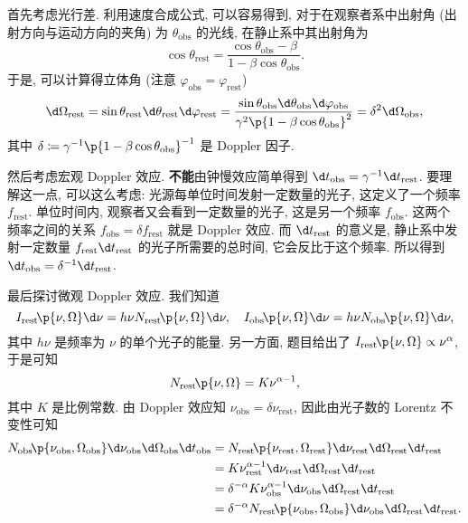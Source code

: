 \documentclass{article}
\newcommand{\mrm}[1]{\mathrm{#1}}
\newcommand{\tbf}[1]{\textbf{#1}}
\newcommand{\alp}{\alpha}
\newcommand{\gma}{\gamma}
\newcommand{\dlt}{\delta}
\newcommand{\vphi}{\varphi}
\newcommand{\tht}{\theta}
\newcommand{\Omg}{\Omega}
\newcommand{\ceq}{\coloneqq}
\newcommand{\fr}{\frac}
\newcommand{\fc}[2]{#1\mathchoice{\!}{\!}{}{}\p{#2}} %
\begin{document}
首先考虑光行差. 利用速度合成公式, 可以容易得到,
对于在观察者系中出射角 (出射方向与运动方向的夹角) 为 $\tht_\mrm{obs}$ 的光线, 在静止系中其出射角为
\[\cos\tht_\mrm{rest}=\fr{\cos\tht_\mrm{obs}-\beta}{1-\beta\cos\tht_\mrm{obs}}.\]
于是, 可以计算得立体角 (注意 $\vphi_\mrm{obs}=\vphi_\mrm{rest}$)
\[\d\Omg_\mrm{rest}=\sin\tht_\mrm{rest}\d\tht_\mrm{rest}\d\vphi_\mrm{rest}
=\fr{\sin\tht_\mrm{obs}\d\tht_\mrm{obs}\d\vphi_\mrm{obs}}{\gma^2\p{1-\beta\cos\tht_\mrm{obs}}^2}
=\dlt^2\d\Omg_\mrm{obs},\]
其中 $\dlt\ceq\gma^{-1}\p{1-\beta\cos\tht_\mrm{obs}}^{-1}$ 是 Doppler 因子.

然后考虑宏观 Doppler 效应. \tbf{不能}由钟慢效应简单得到 $\d t_\mrm{obs}=\gma^{-1}\d t_\mrm{rest}$.
要理解这一点, 可以这么考虑: 光源每单位时间发射一定数量的光子, 这定义了一个频率 $f_\mrm{rest}$.
单位时间内, 观察者又会看到一定数量的光子, 这是另一个频率 $f_\mrm{obs}$.
这两个频率之间的关系 $f_\mrm{obs}=\dlt f_\mrm{rest}$ 就是 Doppler 效应.
而 $\d t_\mrm{rest}$ 的意义是, 静止系中发射一定数量
$f_\mrm{rest}\d t_\mrm{rest}$ 的光子所需要的总时间, 它会反比于这个频率.
所以得到 $\d t_\mrm{obs}=\dlt^{-1}\d t_\mrm{rest}$.

最后探讨微观 Doppler 效应.
我们知道
\[\fc{I_\mrm{rest}}{\nu,\Omg}\d\nu=h\nu\fc{N_\mrm{rest}}{\nu,\Omg}\d\nu,\quad
\fc{I_\mrm{obs}}{\nu,\Omg}\d\nu=h\nu\fc{N_\mrm{obs}}{\nu,\Omg}\d\nu,\]
其中 $h\nu$ 是频率为 $\nu$ 的单个光子的能量.
另一方面, 题目给出了 $\fc{I_\mrm{rest}}{\nu,\Omg}\propto\nu^\alp$, 于是可知
\[\fc{N_\mrm{rest}}{\nu,\Omg}=K\nu^{\alp-1},\]
其中 $K$ 是比例常数.
由 Doppler 效应知 $\nu_\mrm{obs}=\dlt\nu_\mrm{rest}$, 因此由光子数的 Lorentz 不变性可知
\begin{align*}
	\fc{N_\mrm{obs}}{\nu_\mrm{obs},\Omg_\mrm{obs}}\d\nu_\mrm{obs}\d\Omg_\mrm{obs}\d t_\mrm{obs}
	&=\fc{N_\mrm{rest}}{\nu_\mrm{rest},\Omg_\mrm{rest}}\d\nu_\mrm{rest}\d\Omg_\mrm{rest}\d t_\mrm{rest}\\
	&=K\nu_\mrm{rest}^{\alp-1}\d\nu_\mrm{rest}\d\Omg_\mrm{rest}\d t_\mrm{rest}\\
	&=\dlt^{-\alp}K\nu_\mrm{obs}^{\alp-1}\d\nu_\mrm{obs}\d\Omg_\mrm{rest}\d t_\mrm{rest}\\
	&=\dlt^{-\alp}\fc{N_\mrm{rest}}{\nu_\mrm{obs},\Omg_\mrm{obs}}\d\nu_\mrm{obs}\d\Omg_\mrm{rest}\d t_\mrm{rest}.
\end{align*}
\end{document}
